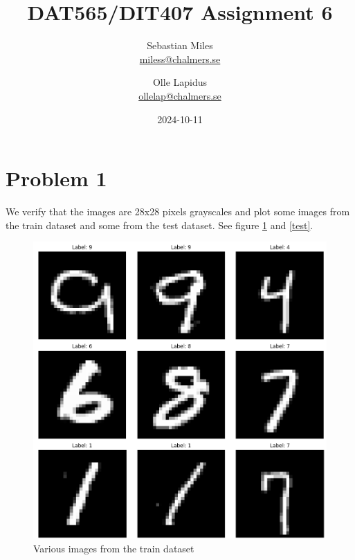 \documentclass[a4paper]{article}
\begin{document}
\author{
  Sebastian Miles \\
  \href{mailto:miless@chalmers.se}{miless@chalmers.se}
  \and
  Olle Lapidus \\
  \href{mailto:ollelap@chalmers.se}{ollelap@chalmers.se}
}
\title{DAT565/DIT407 Assignment 6}
\date{2024-10-11}

\maketitle
\section*{Problem 1}
We verify that the images are 28x28 pixels grayscales and plot some images from the train dataset and some from the test dataset. See figure \ref{hist} and \ref{test}.
\begin{figure}[H]
	\begin{center}
		\includegraphics[scale=0.4]{datasets.png}
		\caption{Various images from the train dataset}
		\label{hist}
	\end{center}
\end{figure}
\end{document}
